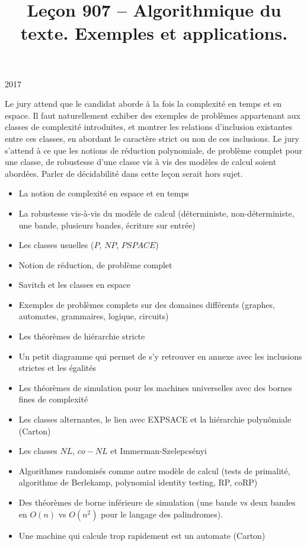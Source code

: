 \documentclass{agregfiche}
\title{Leçon 907 -- Algorithmique du texte. Exemples et applications.}
\begin{document}
\maketitle

\secrapports

\begin{rapport}{2017}

Le jury attend que le candidat aborde à la fois la complexité en temps et en
espace. Il faut naturellement exhiber des exemples de problèmes appartenant aux
classes de complexité introduites, et montrer les relations d’inclusion
existantes entre ces classes, en abordant le caractère strict ou non de ces
inclusions. Le jury s’attend à ce que les notions de réduction polynomiale, de
problème complet pour une classe, de robustesse d’une classe vis à vis des
modèles de calcul soient abordées. Parler de décidabilité dans cette leçon
serait hors sujet.

\end{rapport}

\secindispensables

\begin{itemize}
    \item La notion de complexité en espace et en temps
    \item La robustesse vis-à-vis du modèle de calcul 
        (déterministe, non-déterministe, une bande, plusieurs 
        bandes, écriture sur entrée)
    \item Les classes usuelles ($P$, $NP$, $PSPACE$)
    \item Notion de réduction, de problème complet
    \item Savitch et les classes en espace
    \item Exemples de problèmes complets sur des 
        domaines différents (graphes, automates,
        grammaires, logique, circuits)
    \item Les théorèmes de hiérarchie stricte
    \item Un petit diagramme qui permet de s'y retrouver 
        en annexe avec les inclusions strictes et les égalités
\end{itemize}

\secidees

\begin{itemize}
    \item Les théorèmes de simulation pour les machines 
        universelles avec des bornes fines de complexité
    \item Les classes alternantes, le lien avec 
        EXPSACE et la hiérarchie polynômiale (Carton)
    \item Les classes $NL$, $co-NL$ et Immerman-Szelepcsényi
    \item Algorithmes randomisés comme autre modèle de calcul
        (tests de primalité, algorithme de Berlekamp,
        polynomial identity testing, RP, coRP)
    \item Des théorèmes de borne inférieure de simulation
        (une bande vs deux bandes en $O(n)$ vs $O(n^2)$ 
        pour le langage des palindromes).
    \item Une machine qui calcule trop rapidement est un automate 
        (Carton)
\end{itemize}
\end{document}
